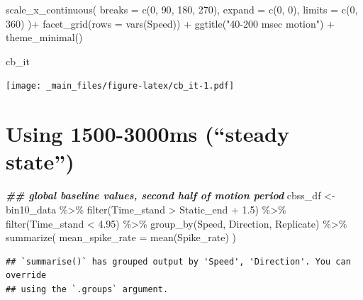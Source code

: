 \documentclass[
]{book}
\newenvironment{Shaded}{\begin{snugshade}}{\end{snugshade}}
\newcommand{\AttributeTok}[1]{\textcolor[rgb]{0.77,0.63,0.00}{#1}}
\newcommand{\DecValTok}[1]{\textcolor[rgb]{0.00,0.00,0.81}{#1}}
\newcommand{\DocumentationTok}[1]{\textcolor[rgb]{0.56,0.35,0.01}{\textbf{\textit{#1}}}}
\newcommand{\FloatTok}[1]{\textcolor[rgb]{0.00,0.00,0.81}{#1}}
\newcommand{\FunctionTok}[1]{\textcolor[rgb]{0.00,0.00,0.00}{#1}}
\newcommand{\NormalTok}[1]{#1}
\newcommand{\OtherTok}[1]{\textcolor[rgb]{0.56,0.35,0.01}{#1}}
\newcommand{\SpecialCharTok}[1]{\textcolor[rgb]{0.00,0.00,0.00}{#1}}
\newcommand{\StringTok}[1]{\textcolor[rgb]{0.31,0.60,0.02}{#1}}
\begin{document}
\begin{Shaded}
\begin{Highlighting}[]
  \FunctionTok{scale\_x\_continuous}\NormalTok{(}
    \AttributeTok{breaks =} \FunctionTok{c}\NormalTok{(}\DecValTok{0}\NormalTok{, }\DecValTok{90}\NormalTok{, }\DecValTok{180}\NormalTok{, }\DecValTok{270}\NormalTok{),}
    \AttributeTok{expand =} \FunctionTok{c}\NormalTok{(}\DecValTok{0}\NormalTok{, }\DecValTok{0}\NormalTok{),}
    \AttributeTok{limits =} \FunctionTok{c}\NormalTok{(}\DecValTok{0}\NormalTok{, }\DecValTok{360}\NormalTok{)}
\NormalTok{  )}\SpecialCharTok{+}
  \FunctionTok{facet\_grid}\NormalTok{(}\AttributeTok{rows =} \FunctionTok{vars}\NormalTok{(Speed)) }\SpecialCharTok{+}
  \FunctionTok{ggtitle}\NormalTok{(}\StringTok{"40{-}200 msec motion"}\NormalTok{) }\SpecialCharTok{+}
  \FunctionTok{theme\_minimal}\NormalTok{()}

\NormalTok{cb\_it}
\end{Highlighting}
\end{Shaded}

\texttt{[image: \_main\_files/figure-latex/cb\_it-1.pdf]}

\hypertarget{using-1500-3000ms-steady-state}{%
\section{Using 1500-3000ms (``steady state'')}\label{using-1500-3000ms-steady-state}}

\begin{Shaded}
\begin{Highlighting}[]
\DocumentationTok{\#\# global baseline values, second half of motion period}
\NormalTok{cbss\_df }\OtherTok{\textless{}{-}}
\NormalTok{  bin10\_data }\SpecialCharTok{\%\textgreater{}\%}
  \FunctionTok{filter}\NormalTok{(Time\_stand }\SpecialCharTok{\textgreater{}}\NormalTok{ Static\_end }\SpecialCharTok{+} \FloatTok{1.5}\NormalTok{) }\SpecialCharTok{\%\textgreater{}\%}
  \FunctionTok{filter}\NormalTok{(Time\_stand }\SpecialCharTok{\textless{}} \FloatTok{4.95}\NormalTok{) }\SpecialCharTok{\%\textgreater{}\%}
  \FunctionTok{group\_by}\NormalTok{(Speed, Direction, Replicate) }\SpecialCharTok{\%\textgreater{}\%}
  \FunctionTok{summarize}\NormalTok{(}
    \AttributeTok{mean\_spike\_rate =} \FunctionTok{mean}\NormalTok{(Spike\_rate)}
\NormalTok{  )}
\end{Highlighting}
\end{Shaded}

\begin{verbatim}
## `summarise()` has grouped output by 'Speed', 'Direction'. You can override
## using the `.groups` argument.
\end{verbatim}
\end{document}
